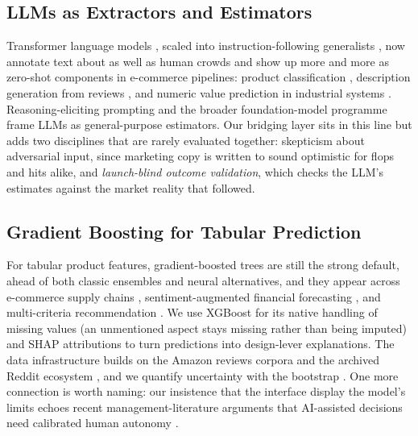 \documentclass[journal]{IEEEtran}
\begin{document}
\subsection{LLMs as Extractors and Estimators}
Transformer language models \cite{vaswani2017attention,devlin2019bert}, scaled into instruction-following generalists \cite{brown2020gpt3,ouyang2022instruct,openai2023gpt4,gemini2023,touvron2023llama}, now annotate text about as well as human crowds \cite{gilardi2023chatgpt} and show up more and more as zero-shot components in e-commerce pipelines: product classification \cite{roumeliotis2025llms}, description generation from reviews \cite{gutierrez2025zeroshot}, and numeric value prediction in industrial systems \cite{hidayat2025custody}. Reasoning-eliciting prompting \cite{wei2022chain} and the broader foundation-model programme \cite{bommasani2021foundation} frame LLMs as general-purpose estimators. Our bridging layer sits in this line but adds two disciplines that are rarely evaluated together: skepticism about adversarial input, since marketing copy is written to sound optimistic for flops and hits alike, and \emph{launch-blind outcome validation}, which checks the LLM's estimates against the market reality that followed.

\subsection{Gradient Boosting for Tabular Prediction}
For tabular product features, gradient-boosted trees \cite{friedman2001greedy,chen2016xgboost,ke2017lightgbm} are still the strong default, ahead of both classic ensembles \cite{breiman2001random} and neural alternatives, and they appear across e-commerce supply chains \cite{sayyad2024catboost}, sentiment-augmented financial forecasting \cite{zhen2025stock,shang2025bitcoin}, and multi-criteria recommendation \cite{rakee2025temul}. We use XGBoost for its native handling of missing values (an unmentioned aspect stays missing rather than being imputed) and SHAP attributions \cite{lundberg2017shap} to turn predictions into design-lever explanations. The data infrastructure builds on the Amazon reviews corpora \cite{he2016ups,hou2024amazon} and the archived Reddit ecosystem \cite{baumgartner2020pushshift}, and we quantify uncertainty with the bootstrap \cite{efron1979bootstrap}. One more connection is worth naming: our insistence that the interface display the model's limits echoes recent management-literature arguments that AI-assisted decisions need calibrated human autonomy \cite{cristofaro2026dancing}.
\end{document}
